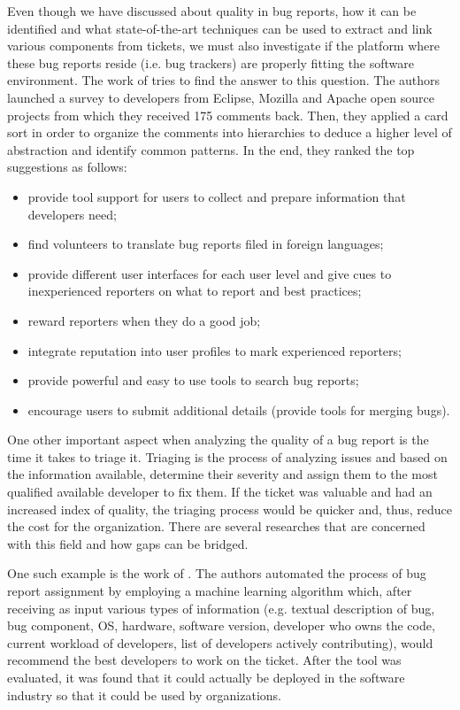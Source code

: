 \documentclass{mprop}
\begin{document}
Even though we have discussed about quality in bug reports, how it can be 
identified and what state-of-the-art techniques can be used to extract and 
link various components from tickets, we must also investigate if the platform 
where these bug reports 
reside (i.e. bug trackers) are properly fitting the software environment. 
The work of \citet{just2008towards} tries to find the answer to this question.
The authors launched a survey to developers from Eclipse, Mozilla and Apache
open source projects from which they received 175 comments back. Then, they
applied a card sort in order to organize the comments into hierarchies to 
deduce a higher level of abstraction and identify common patterns. In the end,
they ranked the top suggestions as follows:
  \begin{itemize}
    \item provide tool support for users to collect and prepare information that 
      developers need;
    \item find volunteers to translate bug reports filed in foreign languages;
    \item provide different user interfaces for each user level and give cues to 
      inexperienced reporters on what to report and best practices;
    \item reward reporters when they do a good job;
    \item integrate reputation into user profiles to mark experienced reporters;
    \item provide powerful and easy to use tools to search bug reports;
    \item encourage users to submit additional details (provide tools for merging 
      bugs).
  \end{itemize}

One other important aspect when analyzing the quality of a bug report is the
time it takes to triage it. Triaging is the process of analyzing issues and 
based on the information available, determine their severity and assign them to the
most qualified available developer to fix them. If the ticket was valuable and had 
an increased index of quality, the triaging process would be quicker and,
thus, reduce the cost for the organization. There are several researches that 
are concerned with this field and how gaps can be bridged.

One such example is the work of \citet{anvik2006automating}. The authors
automated the process of bug report assignment by employing a machine learning 
algorithm which, after receiving as input various types of information (e.g. 
textual description of bug, bug component, OS, hardware, software version, 
developer who owns the code, current workload of developers, list of developers 
actively contributing), would recommend the best developers to work on the ticket. 
After the tool was evaluated, it was found that it could actually be deployed
in the software industry so that it could be used by organizations.
\end{document}
